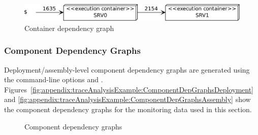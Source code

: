 \begin{figure}[h]\centering
\includegraphics[scale=0.45]{../../examples/userguide/ch5--trace-monitoring-aspectj/testdata/kieker-20100830-082225522-UTC-example-plots/containerDependencyGraph-crop}
\caption{Container dependency graph}
\label{fig:appendix:traceAnalysisExample:ContainerDepGraph}
\end{figure}

\subsubsection{Component Dependency Graphs}

Deployment/assembly-level component dependency graphs are generated using the %
command-line options \OPT{\OPTplotDeploymentComponentDependencyGraph} and %
\OPT{\OPTplotAssemblyComponentDependencyGraph}. %
Figures~\ref{fig:appendix:traceAnalysisExample:ComponentDepGraphsDeployment} and %
\ref{fig:appendix:traceAnalysisExample:ComponentDepGraphsAssembly} show the %
component dependency graphs for the monitoring data used in this section. 

\begin{figure}[h]\centering
{}
\caption{Component dependency graphs}
\label{fig:appendix:traceAnalysisExample:ComponentDepGraphs}
\end{figure}

